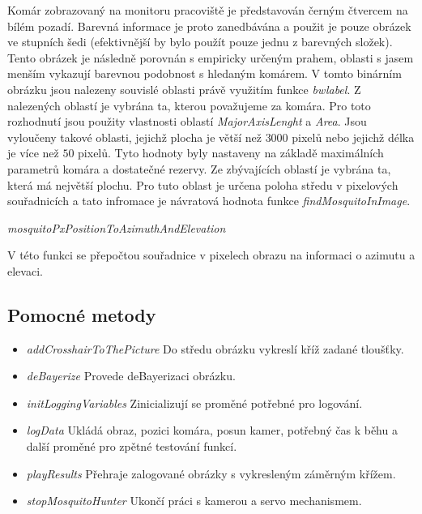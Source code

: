 \documentclass[a4paper,10pt]{article}
\begin{document}
Komár zobrazovaný na monitoru pracoviště je představován černým čtvercem na bílém pozadí. Barevná informace je proto zanedbávána a použit je pouze obrázek ve stupních šedi (efektivnější by bylo použít pouze jednu z barevných složek). Tento obrázek je následně porovnán s empiricky určeným prahem, oblasti s jasem menším vykazují barevnou podobnost s hledaným komárem. V tomto binárním obrázku jsou nalezeny souvislé oblasti právě využitím funkce \textit{bwlabel}. Z nalezených oblastí je vybrána ta, kterou považujeme za komára. Pro toto rozhodnutí jsou použity vlastnosti oblastí \textit{MajorAxisLenght} a \textit{Area}. Jsou vyloučeny takové oblasti, jejichž plocha je větší než $3000$ pixelů nebo jejichž délka je více než $50$ pixelů. Tyto hodnoty byly nastaveny na základě maximálních parametrů komára a dostatečné rezervy. Ze zbývajících oblastí je vybrána ta, která má největší plochu. Pro tuto oblast je určena poloha středu v pixelových souřadnicích a tato infromace je návratová hodnota funkce \textit{findMosquitoInImage}.


\vspace{0.5cm}
\textit{mosquitoPxPositionToAzimuthAndElevation}

V této funkci se přepočtou souřadnice v pixelech obrazu na informaci o azimutu a elevaci.


\subsection{Pomocné metody}

\begin{itemize}
 \item \textit{addCrosshairToThePicture} Do středu obrázku vykreslí kříž zadané tloušťky. 
 \item \textit{deBayerize} Provede deBayerizaci obrázku.
\item \textit{initLoggingVariables} Zinicializují se proměné potřebné pro logování.
 \item \textit{logData} Ukládá obraz, pozici komára, posun kamer, potřebný čas k běhu a další proměné pro zpětné testování funkcí.
\item \textit{playResults} Přehraje zalogované obrázky s vykresleným záměrným křížem.
\item \textit{stopMosquitoHunter} Ukončí práci s kamerou a servo mechanismem.

\end{itemize}
\end{document}
